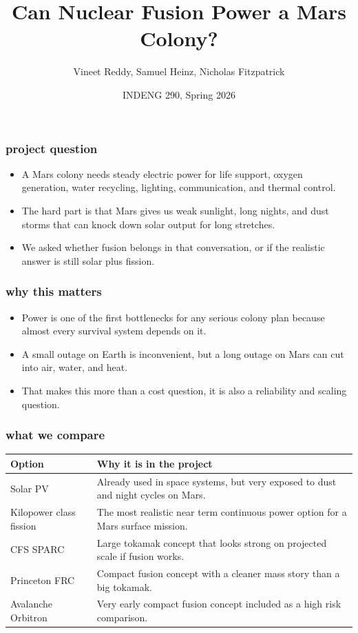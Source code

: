 \documentclass[11pt, xcolor={dvipsnames}, usepdftitle=false]{beamer}
\title{Can Nuclear Fusion Power a Mars Colony?}
\author{Vineet Reddy, Samuel Heinz, Nicholas Fitzpatrick}
\date{INDENG 290, Spring 2026}
\begin{document}
\frame{\titlepage}

\begin{frame}
\frametitle{project question}
\begin{itemize}
\item A Mars colony needs steady electric power for life support, oxygen generation, water recycling, lighting, communication, and thermal control.
\item The hard part is that Mars gives us weak sunlight, long nights, and dust storms that can knock down solar output for long stretches.
\item We asked whether fusion belongs in that conversation, or if the realistic answer is still solar plus fission.
\end{itemize}
\end{frame}

\begin{frame}
\frametitle{why this matters}
\begin{itemize}
\item Power is one of the first bottlenecks for any serious colony plan because almost every survival system depends on it.
\item A small outage on Earth is inconvenient, but a long outage on Mars can cut into air, water, and heat.
\item That makes this more than a cost question, it is also a reliability and scaling question.
\end{itemize}
\end{frame}

\begin{frame}
\frametitle{what we compare}
\scriptsize
\begin{tabular}{>{\raggedright\arraybackslash}p{1.65in}>{\raggedright\arraybackslash}p{3.1in}}
\toprule
Option & Why it is in the project \\
\midrule
Solar PV & Already used in space systems, but very exposed to dust and night cycles on Mars. \\
Kilopower class fission & The most realistic near term continuous power option for a Mars surface mission. \\
CFS SPARC & Large tokamak concept that looks strong on projected scale if fusion works. \\
Princeton FRC & Compact fusion concept with a cleaner mass story than a big tokamak. \\
Avalanche Orbitron & Very early compact fusion concept included as a high risk comparison. \\
\bottomrule
\end{tabular}
\end{frame}
\end{document}
